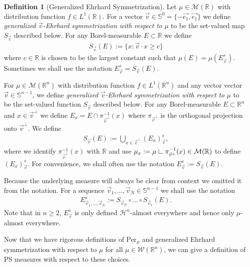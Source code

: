 \documentclass[12pt]{amsart}
\numberwithin{equation}{section}
\theoremstyle{plain}
\theoremstyle{definition}
\newtheorem{definition}[theorem]{Definition}
\newcommand{\res}{\hbox{ {\vrule height .22cm}{\leaders\hrule\hskip.2cm} }}
\begin{document}
\begin{definition}[Generalized Ehrhard Symmetrization]
Let $\mu \in \mathcal{M}(\mathbb{R})$ with distribution function $f \in L^1(\mathbb{R})$. For a vector $\vec{v} \in \mathbb{S}^{0} = \{-\vec{e_1}, \vec{e_1}\}$ we define \textit{generalized $\vec{v}$-Ehrhard symmetrization with respect to $\mu$} to be the set-valued map $S_{\vec{v}}$ described below.  For any Borel-measurable $E \subset \mathbb{R}$ we define
\begin{align*}
S_{\vec{v}}(E):= \{x: \vec{v} \cdot x \ge c \}
\end{align*}
where $c \in \mathbb{R}$ is chosen to be the largest constant such that $\mu(E) = \mu(E^s_{\vec{v}})$. Sometimes we shall use the notation $E^s_{\vec{v}} = S_{\vec{v}}(E)$.

For $\mu \in \mathcal{M}(\mathbb{R}^n)$ with distribution function $f \in L^1(\mathbb{R}^n)$ and any vector vector $\vec{v} \in \mathbb{S}^{n-1}$, we define \textit{generalized $\vec{v}$-Ehrhard symmetrization with respect to $\mu$} to be the set-valued function $S_{\vec{v}}$ described below.  For any Borel-measurable $E \subset \mathbb{R}^n$ and $x \in \vec{v}^{\perp}$ we define $E_x = E \cap \pi_{\vec{v}^{\perp}}^{-1}(x)$ where $\pi_{\vec{v}^{\perp}}$ is the orthogonal projection onto $\vec{v}^{\perp}$.  We define
\begin{align*}
    S_{\vec{v}}(E) := \bigcup_{x \in \vec{v}^{\perp}}(E_x)^s_{\vec{v}},
\end{align*}
where we identify $\pi_{\vec{v}^{\perp}}^{-1}(x)$ with $\mathbb{R}$ and use $\mu_x := \mu\res \pi_{\vec{v}^{\perp}}^{-1}(x) \in \mathcal{M}(\mathbb{R})$ to define $(E_x)^s_{\vec{v}}$. For convenience, we shall often use the notation $E^s_{\vec{v}}:= S_{\vec{v}}(E)$.  

Because the underlying measure will always be clear from context we omitted it from the notation. For a sequence $\vec{v}_1, ..., \vec{v}_N \in \mathbb{S}^{n-1}$ we shall use the notation
\begin{align}
    E^s_{\vec{v}_1, ..., \vec{v}_N} := S_{\vec{v}_N} \circ ... \circ S_{\vec{v}_1}(E). 
\end{align}
Note that in $n \ge 2$, $E_{\vec{v}}^s$ is only defined $\mathcal{H}^{n}$-almost everywhere and hence only $\mu$-almost everywhere.
\end{definition}

Now that we have rigorous definitions of $\text{Per}_{\mu}$ and generalized Ehrhard symmetrization with respect to $\mu$ for all $\mu \in \mathscr{W}(\mathbb{R}^n)$, we can give a definition of PS measures with respect to these choices.  
\end{document}
